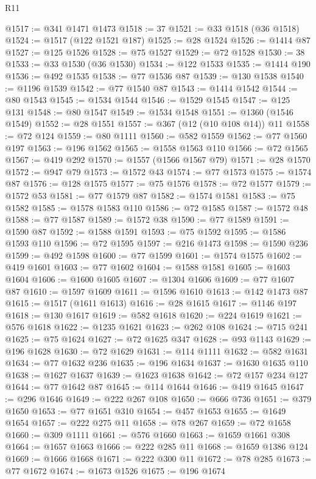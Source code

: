 \begin{lexlean}{R11}
\begin{coremodule}
@1517 := @341 @1471 @1473
@1518 := 37
@1521 := @33 @1518 (@36 @1518)
@1524 := @1517 (@122 @1521 @187)
@1525 := @28 @1524
@1526 := @1414 @87
@1527 := @125 @1526
@1528 := @75 @1527
@1529 := @72 @1528
@1530 := 38
@1533 := @33 @1530 (@36 @1530)
@1534 := @122 @1533
@1535 := @1414 @190
@1536 := @492 @1535
@1538 := @77 @1536 @87
@1539 := @130 @1538
@1540 := @1196 @1539
@1542 := @77 @1540 @87
@1543 := @1414 @1542
@1544 := @80 @1543
@1545 := @1534 @1544
@1546 := @1529 @1545
@1547 := @125 @131
@1548 := @80 @1547
@1549 := @1534 @1548
@1551 := @1360 (@1546 @1549)
@1552 := @28 @1551
@1557 := @367 (@12 (@10 @108 @14)) @11
@1558 := @72 @124
@1559 := @80 @1111
@1560 := @582 @1559
@1562 := @77 @1560 @197
@1563 := @196 @1562
@1565 := @1558 @1563 @110
@1566 := @72 @1565
@1567 := @419 @292
@1570 := @1557 (@1566 @1567 @79)
@1571 := @28 @1570
@1572 := @947 @79
@1573 := @1572 @43
@1574 := @77 @1573
@1575 := @1574 @87
@1576 := @128 @1575
@1577 := @75 @1576
@1578 := @72 @1577
@1579 := @1572 @53
@1581 := @77 @1579 @87
@1582 := @1574 @1581
@1583 := @75 @1582
@1585 := @1578 @1583 @110
@1586 := @72 @1585
@1587 := @1572 @48
@1588 := @77 @1587
@1589 := @1572 @38
@1590 := @77 @1589
@1591 := @1590 @87
@1592 := @1588 @1591
@1593 := @75 @1592
@1595 := @1586 @1593 @110
@1596 := @72 @1595
@1597 := @216 @1473
@1598 := @1590 @236
@1599 := @492 @1598
@1600 := @77 @1599
@1601 := @1574 @1575
@1602 := @419 @1601
@1603 := @77 @1602
@1604 := @1588 @1581
@1605 := @1603 @1604
@1606 := @1600 @1605
@1607 := @1304 @1606
@1609 := @77 @1607 @87
@1610 := @1597 @1609
@1611 := @1596 @1610
@1613 := @142 @1473 @87
@1615 := @1517 (@1611 @1613)
@1616 := @28 @1615
@1617 := @1146 @197
@1618 := @130 @1617
@1619 := @582 @1618
@1620 := @224 @1619
@1621 := @576 @1618
@1622 := @1235 @1621
@1623 := @262 @108
@1624 := @715 @241
@1625 := @75 @1624
@1627 := @72 @1625 @347
@1628 := @93 @1143
@1629 := @196 @1628
@1630 := @72 @1629
@1631 := @114 @1111
@1632 := @582 @1631
@1634 := @77 @1632 @236
@1635 := @196 @1634
@1637 := @1630 @1635 @110
@1638 := @1627 @1637
@1639 := @1623 @1638
@1642 := @72 @157 @234 @127
@1644 := @77 @1642 @87
@1645 := @114 @1644
@1646 := @419 @1645
@1647 := @296 @1646
@1649 := @222 @267 @108
@1650 := @666 @736
@1651 := @379 @1650
@1653 := @77 @1651 @310
@1654 := @457 @1653
@1655 := @1649 @1654
@1657 := @222 @275 @11
@1658 := @78 @267
@1659 := @72 @1658
@1660 := @309 @1111
@1661 := @576 @1660
@1663 := @1659 @1661 @308
@1664 := @1657 @1663
@1666 := @222 @285 @11
@1668 := @1659 @1386 @124
@1669 := @1666 @1668
@1671 := @222 @300 @11
@1672 := @78 @285
@1673 := @77 @1672
@1674 := @1673 @1526
@1675 := @196 @1674

\end{coremodule}
\end{lexlean}
